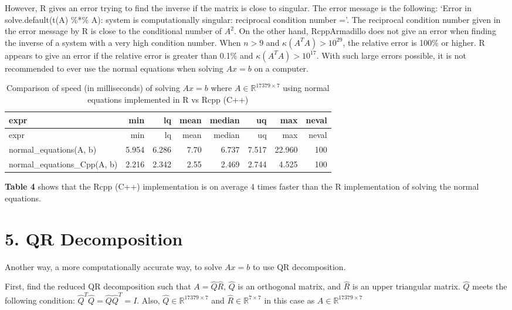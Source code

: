 \documentclass[
]{article}
\begin{document}
However, R gives an error trying to find the inverse if the matrix is
close to singular. The error message is the following: `Error in
solve.default(t(A) \%*\% A): system is computationally singular:
reciprocal condition number ='. The reciprocal condition number given in
the error message by R is close to the conditional number of \(A^{2}\).
On the other hand, RcppArmadillo does not give an error when finding the
inverse of a system with a very high condition number. When \(n > 9\)
and \(\kappa(A^{T}A) > 10^{29}\), the relative error is 100\% or higher.
R appears to give an error if the relative error is greater than 0.1\%
and \(\kappa(A^{T}A) > 10^{17}\). With such large errors possible, it is
not recommended to ever use the normal equations when solving \(Ax = b\)
on a computer.

\begin{longtable}[]{@{}lrrrrrrr@{}}
\caption{Comparison of speed (in milliseconds) of solving \(Ax = b\)
where \(A \in \mathbb{R}^{17379 \times 7}\) using normal equations
implemented in R vs Rcpp (C++)}\tabularnewline
\toprule
expr & min & lq & mean & median & uq & max & neval\tabularnewline
\midrule
\endfirsthead
\toprule
expr & min & lq & mean & median & uq & max & neval\tabularnewline
\midrule
\endhead
normal\_equations(A, b) & 5.954 & 6.286 & 7.70 & 6.737 & 7.517 & 22.960
& 100\tabularnewline
normal\_equations\_Cpp(A, b) & 2.216 & 2.342 & 2.55 & 2.469 & 2.744 &
4.525 & 100\tabularnewline
\bottomrule
\end{longtable}

\textbf{Table 4} shows that the Rcpp (C++) implementation is on average
4 times faster than the R implementation of solving the normal
equations.

\hypertarget{qr-decomposition}{%
\section{5. QR Decomposition}\label{qr-decomposition}}

Another way, a more computationally accurate way, to solve \(Ax = b\) to
use QR decomposition.

First, find the reduced QR decomposition such that
\(A = \hat{Q}\hat{R}\), \(\hat{Q}\) is an orthogonal matrix, and
\(\hat{R}\) is an upper triangular matrix. \(\hat{Q}\) meets the
following condition: \(\hat{Q}^{T}\hat{Q} = \hat{Q}\hat{Q}^{T} = I\).
Also, \(\hat{Q} \in \mathbb{R}^{17379 \times 7}\) and
\(\hat{R} \in \mathbb{R}^{7 \times 7}\) in this case as
\(A \in \mathbb{R}^{17379 \times 7}\)
\end{document}
